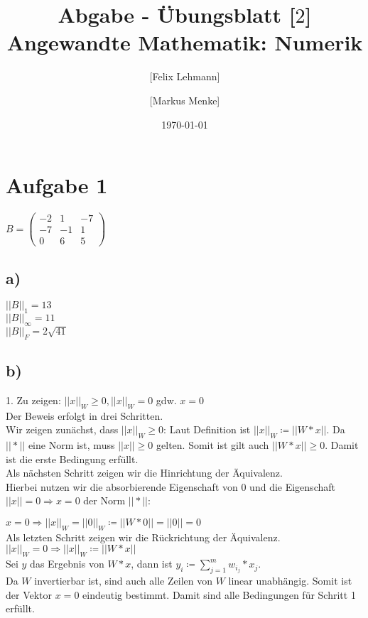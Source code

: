 \documentclass[10pt,a4paper]{article}
\begin{document}
\title{Abgabe - Übungsblatt [$2$]\\
\small{Angewandte Mathematik: Numerik}}
\author{ [Felix Lehmann] \and [Markus Menke]}
\date{\today}
\maketitle

\section*{Aufgabe 1}
$B = \begin{pmatrix}
    -2 &  1 & -7\\
    -7 & -1 &  1\\
     0 &  6 &  5
    \end{pmatrix}$

\subsection*{a)}
$||B||_1 = 13$\\
$||B||_\infty = 11$\\
$||B||_F = 2\sqrt{41}$

\subsection*{b)}
1. Zu zeigen: $||x||_W \geq 0, ||x||_W = 0$ gdw. $ x = 0$\\

Der Beweis erfolgt in drei Schritten.\\
Wir zeigen zunächst, dass $||x||_W \geq 0$:
Laut Definition ist $||x||_W \coloneqq ||W*x||$. Da $||*||$ eine Norm ist, muss $||x|| \geq 0$ gelten. Somit ist gilt auch $||W*x|| \geq 0$. Damit ist die erste Bedingung erfüllt.\\

Als nächsten Schritt zeigen wir die Hinrichtung der Äquivalenz.\\ Hierbei nutzen wir die absorbierende Eigenschaft von 0 und die Eigenschaft $||x|| = 0 \Rightarrow x = 0$ der Norm $||*||$:

$x = 0 \Rightarrow ||x||_W = ||0||_W \coloneqq ||W*0|| = ||0|| = 0$\\

Als letzten Schritt zeigen wir die Rückrichtung der Äquivalenz.\\
$||x||_W = 0 \Rightarrow ||x||_W \coloneqq ||W*x||$\\
Sei $y$ das Ergebnis von $W*x$, dann ist $y_i \coloneqq \sum_{j=1}^m w_i_j * x_j$.\\
Da $W$ invertierbar ist, sind auch alle Zeilen von $W$ linear unabhängig. Somit ist der Vektor $x=0$ eindeutig bestimmt. Damit sind alle Bedingungen für Schritt 1 erfüllt.\\
\end{document}
